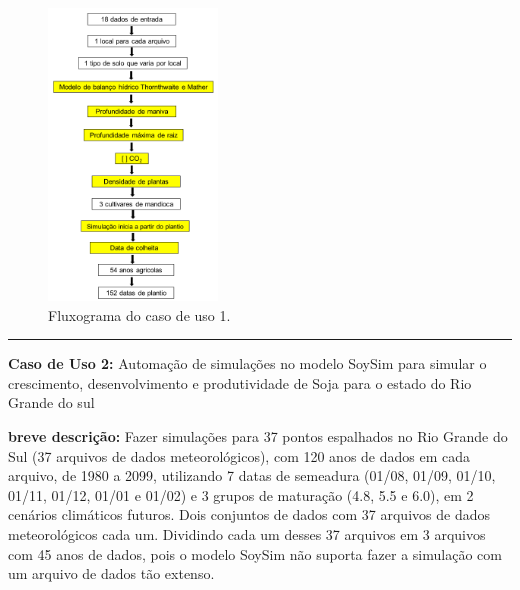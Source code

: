 \documentclass[tg]{mdtufsm}
\begin{document}

                \bigskip
            	\begin{figure}[!htbp]
            		{\centering
            		\includegraphics[width=0.4\textwidth]{imagens/SimanihotFlux}
            		\caption{Fluxograma do caso de uso 1.}
            		\label{fig:SimanihotFlux}}
            	\end{figure}
                \bigskip


                \hrule \bigskip
            	{\bf Caso de Uso 2:}
                    Automação de simulações no modelo SoySim para simular o crescimento, desenvolvimento e produtividade de Soja para o estado do Rio Grande do sul
            	    \bigskip

            	{\bf breve descrição:}
                    Fazer simulações para 37 pontos espalhados no Rio Grande do Sul (37 arquivos de dados meteorológicos), com 120 anos de dados em cada arquivo, de 1980 a 2099, utilizando 7 datas de semeadura (01/08, 01/09, 01/10, 01/11, 01/12, 01/01 e 01/02) e 3 grupos de maturação (4.8, 5.5 e 6.0), em 2 cenários climáticos futuros. Dois conjuntos de dados com 37 arquivos de dados meteorológicos cada um. Dividindo cada um desses 37 arquivos em 3 arquivos com 45 anos de dados, pois o modelo SoySim não suporta fazer a simulação com um arquivo de dados tão extenso.
            	    \bigskip
\end{document}
